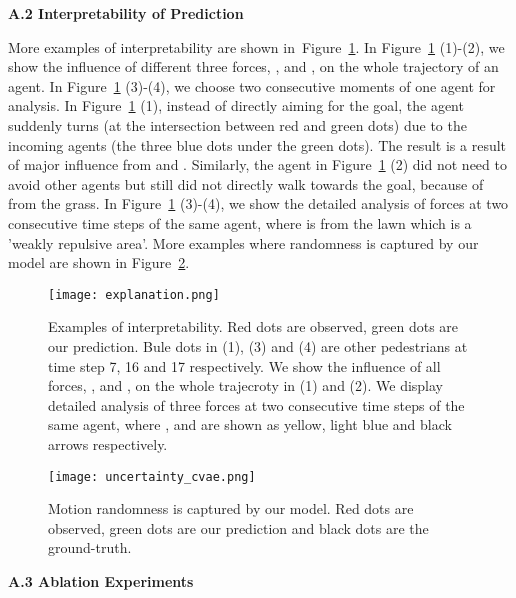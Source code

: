 \documentclass[runningheads]{llncs}
\newcommand{\Figref}[1]{Figure~\ref{fig:#1}}
\begin{document}
\vspace{15pt}
\noindent
\textbf{\large A.2 Interpretability of Prediction}
\vspace{10pt}

\noindent
More examples of interpretability are shown in~\Figref{interpret_supp}. In \Figref{interpret_supp} (1)-(2), we show the influence of different three forces, ,  and , on the whole trajectory of an agent. In \Figref{interpret_supp} (3)-(4), we choose two consecutive moments of one agent for analysis. In \Figref{interpret_supp} (1), instead of directly aiming for the goal, the agent suddenly turns (at the intersection between red and green dots) due to the incoming agents (the three blue dots under the green dots). The result is a result of major influence from  and . Similarly, the agent in \Figref{interpret_supp} (2) did not need to avoid other agents but still did not directly walk towards the goal, because of  from the grass. In \Figref{interpret_supp} (3)-(4), we show the detailed analysis of forces at two consecutive time steps of the same agent, where  is from the lawn which is a 'weakly repulsive area'.  
More examples where randomness is captured by our model are shown in \Figref{randomness_supp}. 

\begin{figure}[tb]
\centering
\texttt{[image: explanation.png]}
\caption{Examples of interpretability. Red dots are observed, green dots are our prediction. Bule dots in (1), (3) and (4) are other pedestrians at time step 7, 16 and 17 respectively. We show the influence of all forces, ,  and , on the whole trajecroty in (1) and (2). We display detailed analysis of three forces at two consecutive time steps of the same agent, where ,  and  are shown as yellow, light blue and black arrows respectively. }
\label{fig:interpret_supp}
\end{figure}

\begin{figure}[tb]
\centering
\texttt{[image: uncertainty\_cvae.png]}
\caption{Motion randomness is captured by our model. Red dots are observed, green dots are our prediction and black dots are the
ground-truth.}
\label{fig:randomness_supp}
\end{figure}

\vspace{15pt}
\noindent
\textbf{\large A.3 Ablation Experiments}
\vspace{10pt}
\end{document}
